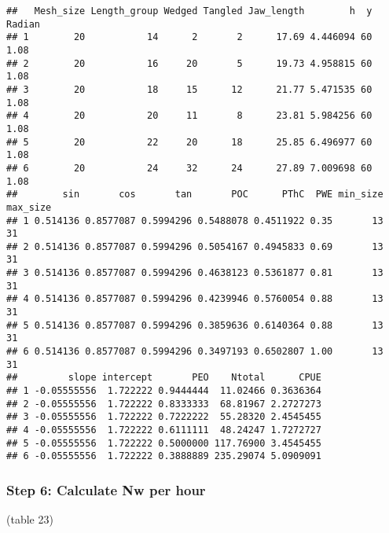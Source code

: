 \documentclass[]{article}
\newenvironment{Shaded}{\begin{snugshade}}{\end{snugshade}}
\newcommand{\KeywordTok}[1]{\textcolor[rgb]{0.13,0.29,0.53}{\textbf{#1}}}
\newcommand{\DecValTok}[1]{\textcolor[rgb]{0.00,0.00,0.81}{#1}}
\newcommand{\CommentTok}[1]{\textcolor[rgb]{0.56,0.35,0.01}{\textit{#1}}}
\newcommand{\OperatorTok}[1]{\textcolor[rgb]{0.81,0.36,0.00}{\textbf{#1}}}
\newcommand{\NormalTok}[1]{#1}
\begin{document}
\begin{verbatim}
##   Mesh_size Length_group Wedged Tangled Jaw_length        h  y Radian
## 1        20           14      2       2      17.69 4.446094 60   1.08
## 2        20           16     20       5      19.73 4.958815 60   1.08
## 3        20           18     15      12      21.77 5.471535 60   1.08
## 4        20           20     11       8      23.81 5.984256 60   1.08
## 5        20           22     20      18      25.85 6.496977 60   1.08
## 6        20           24     32      24      27.89 7.009698 60   1.08
##        sin       cos       tan       POC      PThC  PWE min_size max_size
## 1 0.514136 0.8577087 0.5994296 0.5488078 0.4511922 0.35       13       31
## 2 0.514136 0.8577087 0.5994296 0.5054167 0.4945833 0.69       13       31
## 3 0.514136 0.8577087 0.5994296 0.4638123 0.5361877 0.81       13       31
## 4 0.514136 0.8577087 0.5994296 0.4239946 0.5760054 0.88       13       31
## 5 0.514136 0.8577087 0.5994296 0.3859636 0.6140364 0.88       13       31
## 6 0.514136 0.8577087 0.5994296 0.3497193 0.6502807 1.00       13       31
##         slope intercept       PEO    Ntotal      CPUE
## 1 -0.05555556  1.722222 0.9444444  11.02466 0.3636364
## 2 -0.05555556  1.722222 0.8333333  68.81967 2.2727273
## 3 -0.05555556  1.722222 0.7222222  55.28320 2.4545455
## 4 -0.05555556  1.722222 0.6111111  48.24247 1.7272727
## 5 -0.05555556  1.722222 0.5000000 117.76900 3.4545455
## 6 -0.05555556  1.722222 0.3888889 235.29074 5.0909091
\end{verbatim}

\subsubsection{Step 6: Calculate Nw per
hour}\label{step-6-calculate-nw-per-hour}

(table 23)

\begin{Shaded}
\end{Shaded}
\end{document}
